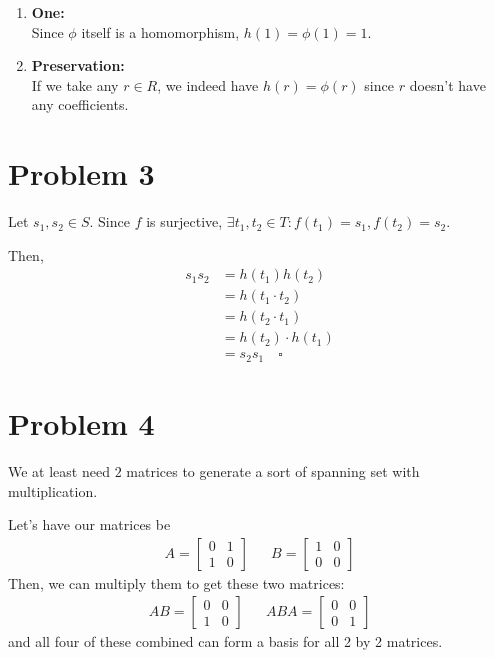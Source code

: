 \documentclass[12pt]{article}
\begin{document}
\begin{enumerate}
  \item \textbf{One:} \\
        Since $\phi$ itself is a homomorphism, $h(1)=\phi(1)=1$.

  \item \textbf{Preservation:} \\
        If we take any $r \in R$, we indeed have $h(r)=\phi(r)$
        since $r$ doesn't have any coefficients.
\end{enumerate}

\section{Problem 3}

Let $s_1, s_2 \in S$.
Since $f$ is surjective, $\exists t_1, t_2 \in T: f(t_1)=s_1, f(t_2)=s_2$.

Then,
\begin{align*}
  s_1s_2
   & = h(t_1)h(t_2)        \\
   & = h(t_1 \cdot t_2)    \\
   & = h(t_2 \cdot t_1)    \\
   & = h(t_2) \cdot h(t_1) \\
   & = s_2s_1\quad\square
\end{align*}

\section{Problem 4}

We at least need $2$ matrices to generate a sort of spanning set with multiplication.

Let's have our matrices be
\begin{align*}
  A=\begin{bmatrix}
      0 & 1 \\
      1 & 0
    \end{bmatrix} &  &
  B=\begin{bmatrix}
      1 & 0 \\
      0 & 0
    \end{bmatrix}
\end{align*}
Then, we can multiply them to get these two matrices:
\begin{align*}
  AB=\begin{bmatrix}
       0 & 0 \\
       1 & 0
     \end{bmatrix} &  &
  ABA=\begin{bmatrix}
        0 & 0 \\
        0 & 1
      \end{bmatrix}
\end{align*}
and all four of these combined can form a basis for all 2 by 2 matrices.
\end{document}
